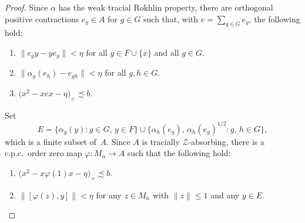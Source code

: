 \documentclass[11pt]{amsart}
\theoremstyle{plain}
\theoremstyle{definition}
\theoremstyle{remark}
\numberwithin{equation}{section}
\newcounter{TmpEnumi}
\begin{document}
\begin{proof}
Since $\alpha$ has the weak tracial Rokhlin property,
there are orthogonal positive contractions $e_g \in A$ for $g \in G$
such that,
with $e = \sum_{g \in G} e_{g}$, the following hold:
%
\begin{enumerate}
\setcounter{enumi}{\value{TmpEnumi}}
%
\item\label{TZS_WTRP_5}
$\| e_{g} y - y e_{g} \| < \eta$
for all $y \in F \cup \{x\}$ and all $g \in G$.
%
\item\label{TZS_WTRP_6}
$\|\alpha_{g} (e_{h}) - e_{gh} \| < \eta$ for all $g, h \in G$.
%
\item\label{TZS_WTRP_7}
$\big( x^{2} - x e x - \eta \big)_{+} \precsim b$.
\setcounter{TmpEnumi}{\value{enumi}}
\end{enumerate}
%
Set
\[
E = \big\{\alpha_{g} (y) \colon g \in G,  \, y \in F \big\}
   \cup \big\{\alpha_{h} (e_{g}), \, \alpha_{h} (e_{g})^{1/2}
         \colon g, \, h \in G \big\},
\]
which is a finite subset of~$A$.
Since $A$ is tracially $\mathcal{Z}$-absorbing,
there is a c.p.c.~order zero map $\varphi \colon M_{n} \to A$
such that the following hold:
%
\begin{enumerate}
\setcounter{enumi}{\value{TmpEnumi}}
\item\label{TZS_WTRP_9}
$\big( x^{2} -x \varphi (1) x - \eta \big)_{+} \precsim b$.
\item\label{TZS_WTRP_8}
$\| [\varphi (z), y] \| < \eta$ for any
$z \in M_{n}$ with $\| z \| \leq 1$ and any $y \in E$.
\setcounter{TmpEnumi}{\value{enumi}}
\end{enumerate}
%


\end{proof}
\end{document}
